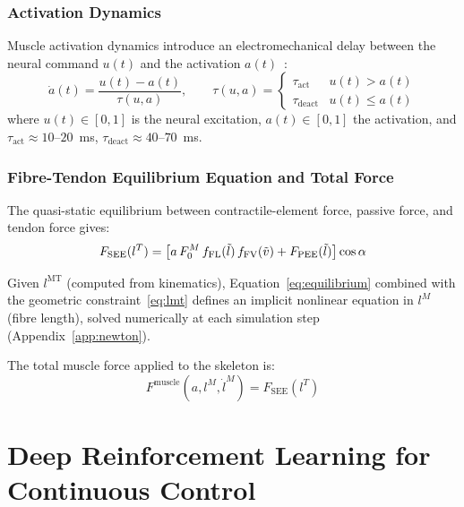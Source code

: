 \subsubsection{Activation Dynamics}

Muscle activation dynamics introduce an electromechanical delay between the neural
command $u(t)$ and the activation $a(t)$~\parencite{Thelen2003}:
\begin{equation}
  \dot{a}(t) = \frac{u(t) - a(t)}{\tau(u,a)}, \qquad
  \tau(u,a) = \begin{cases} \tau_\text{act}   & u(t) > a(t) \\
                            \tau_\text{deact} & u(t) \leq a(t) \end{cases}
  \label{eq:activation}
\end{equation}
where $u(t) \in [0,1]$ is the neural excitation, $a(t) \in [0,1]$ the activation,
and $\tau_\text{act} \approx 10$--$20$~ms, $\tau_\text{deact} \approx 40$--$70$~ms.

\subsubsection{Fibre-Tendon Equilibrium Equation and Total Force}

The quasi-static equilibrium between contractile-element force, passive force,
and tendon force gives:
\begin{equation}
  F_\text{SEE}(l^T) = \left[a\,F_0^M\,f_\text{FL}(\tilde{l})\,f_\text{FV}(\tilde{v})
                      + F_\text{PEE}(\tilde{l})\right] \cos\alpha
  \label{eq:equilibrium}
\end{equation}

Given $l^\text{MT}$ (computed from kinematics),
Equation~\eqref{eq:equilibrium} combined with the geometric
constraint~\eqref{eq:lmt} defines an implicit nonlinear equation in $l^M$
(fibre length), solved numerically at each simulation step
(Appendix~\ref{app:newton}).

The total muscle force applied to the skeleton is:
\begin{equation}
  F^\text{muscle}(a,l^M,\dot{l}^M) = F_\text{SEE}(l^T)
  \label{eq:fmuscle}
\end{equation}

\section{Deep Reinforcement Learning for Continuous Control}


